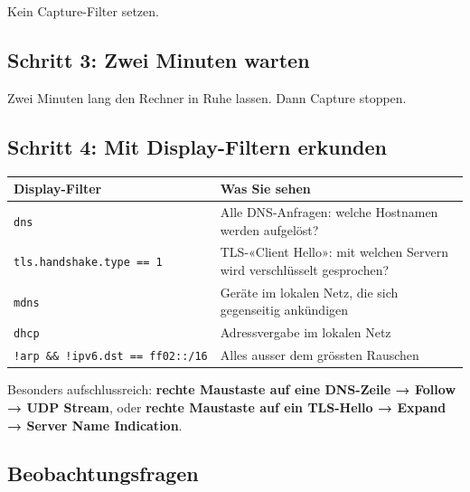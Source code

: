 \documentclass[
  nswissgerman,
  a4paper,
  DIV=11,
  numbers=noendperiod,
  ngerman]{scrreprt}
\newcounter{none} %
\begin{document}
Kein Capture-Filter setzen.

\subsection{Schritt 3: Zwei Minuten
warten}\label{schritt-3-zwei-minuten-warten}

Zwei Minuten lang den Rechner in Ruhe lassen. Dann Capture stoppen.

\subsection{Schritt 4: Mit Display-Filtern
erkunden}\label{schritt-4-mit-display-filtern-erkunden}

{\def\LTcaptype{none} %
\begin{longtable}[]{@{}
  >{\raggedright\arraybackslash}p{}
  >{\raggedright\arraybackslash}p{}@{}}
\toprule\noalign{}
\begin{minipage}[b]{\linewidth}\raggedright
Display-Filter
\end{minipage} & \begin{minipage}[b]{\linewidth}\raggedright
Was Sie sehen
\end{minipage} \\
\midrule\noalign{}
\endhead
\bottomrule\noalign{}
\endlastfoot
\texttt{dns} & Alle DNS-Anfragen: welche Hostnamen werden aufgelöst? \\
\texttt{tls.handshake.type\ ==\ 1} & TLS-«Client Hello»: mit welchen
Servern wird verschlüsselt gesprochen? \\
\texttt{mdns} & Geräte im lokalen Netz, die sich gegenseitig
ankündigen \\
\texttt{dhcp} & Adressvergabe im lokalen Netz \\
\texttt{!arp\ \&\&\ !ipv6.dst\ ==\ ff02::/16} & Alles ausser dem
grössten Rauschen \\
\end{longtable}
}

Besonders aufschlussreich: \textbf{rechte Maustaste auf eine DNS-Zeile →
Follow → UDP Stream}, oder \textbf{rechte Maustaste auf ein TLS-Hello →
Expand → Server Name Indication}.

\subsection{Beobachtungsfragen}\label{beobachtungsfragen-3}
\end{document}
